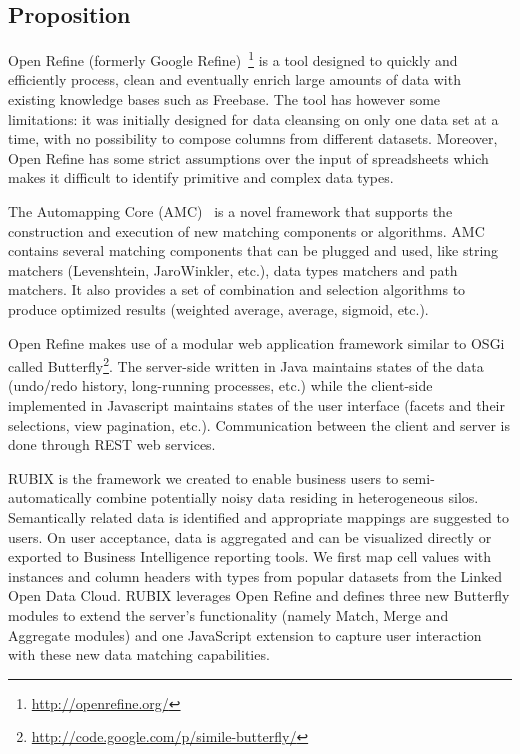 
\subsection{Proposition}\label{Section:RUBIX}

Open Refine (formerly Google Refine)~\footnote{\url{http://openrefine.org/}} is a tool designed to quickly and efficiently process, clean and eventually enrich large amounts of data with existing knowledge bases such as Freebase. The tool has however some limitations: it was initially designed for data cleansing on only one data set at a time, with no possibility to compose columns from different datasets. Moreover, Open Refine has some strict assumptions over the input of spreadsheets which makes it difficult to identify primitive and complex data types.

The Automapping Core (AMC)~\cite{Peukert:ICDE:12} is a novel framework that supports the construction and execution of new matching components or algorithms. AMC contains several matching components that can be plugged and used, like string matchers (Levenshtein, JaroWinkler, etc.), data types matchers and path matchers. It also provides a set of combination and selection algorithms to produce optimized results (weighted average, average, sigmoid,  etc.).

Open Refine makes use of a modular web application framework similar to OSGi called Butterfly\footnote{\url{http://code.google.com/p/simile-butterfly/}}. The server-side written in Java maintains states of the data (undo/redo history, long-running processes, etc.) while the client-side implemented in Javascript maintains states of the user interface (facets and their selections, view pagination, etc.). Communication between the client and server is done through REST web services.

RUBIX is the framework we created to enable business users to semi-automatically combine potentially noisy data residing in heterogeneous silos. Semantically related data is identified and appropriate mappings are suggested to users. On user acceptance, data is aggregated and can be visualized directly or exported to Business Intelligence reporting tools. We first map cell values with instances and column headers with types from popular datasets from the Linked Open Data Cloud. RUBIX leverages Open Refine and defines three new Butterfly modules to extend the server's functionality (namely Match, Merge and Aggregate modules) and one JavaScript extension to capture user interaction with these new data matching capabilities.

